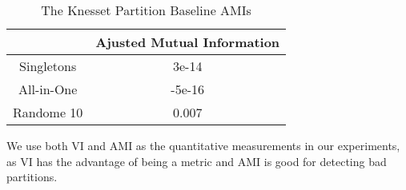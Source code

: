 \begin{table}[h!]
\label{experiment:table:ami_baselines}
\centering
\begin{tabular}{|c|c|}
\hline
       & Ajusted Mutual Information \\ \hline
Singletons & 3e-14 \\
All-in-One & -5e-16 \\
Randome 10 & 0.007 \\
\hline
\end{tabular}
\caption{The Knesset Partition Baseline AMIs}
\end{table}

We use both VI and AMI as the quantitative measurements in our experiments,
as VI has the advantage of being a metric and AMI is good for detecting bad
partitions.

